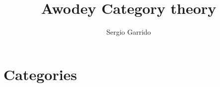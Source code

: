 \documentclass{bookSolutions}
\title{Awodey Category theory}
\author{Sergio Garrido}
\begin{document}
\tableofcontents
\newpage

\chapter{Categories}




%
\end{document}
